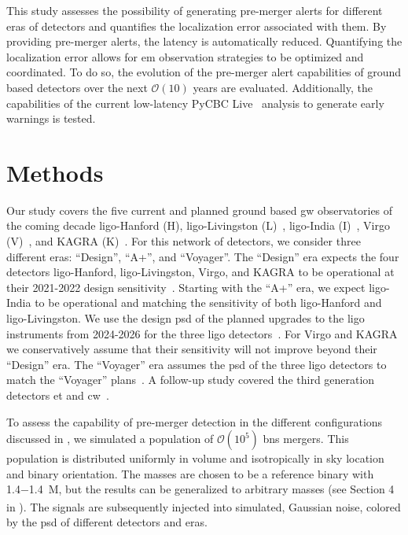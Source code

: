 This study assesses the possibility of generating pre-merger alerts for different eras of detectors and quantifies the localization error associated with them. By providing pre-merger alerts, the latency is automatically reduced. Quantifying the localization error allows for \acrshort{em} observation strategies to be optimized and coordinated. To do so, the evolution of the pre-merger alert capabilities of ground based detectors over the next $\mathcal{O}(10)$ years are evaluated. Additionally, the capabilities of the current low-latency PyCBC Live~\cite{Nitz:2018rgo, DalCanton:2020vpm} analysis to generate early warnings is tested.

\section{Methods}
Our study covers the five current and planned ground based \acrshort{gw} observatories of the coming decade \acrshort{ligo}-Hanford (H), \acrshort{ligo}-Livingston (L)~\cite{LIGOScientific:2014pky}, \acrshort{ligo}-India (I)~\cite{Iyer:2011aaa}, Virgo (V)~\cite{VIRGO:2014yos}, and KAGRA (K)~\cite{KAGRA:2018plz}. For this network of detectors, we consider three different eras: ``Design'', ``A+'', and ``Voyager''. The ``Design'' era expects the four detectors \acrshort{ligo}-Hanford, \acrshort{ligo}-Livingston, Virgo, and KAGRA to be operational at their 2021-2022 design sensitivity~\cite{KAGRA:2013rdx}. Starting with the ``A+'' era, we expect \acrshort{ligo}-India to be operational and matching the sensitivity of both \acrshort{ligo}-Hanford and \acrshort{ligo}-Livingston. We use the design \acrshort{psd} of the planned upgrades to the \acrshort{ligo} instruments from 2024-2026 for the three \acrshort{ligo} detectors~\cite{Barsotti:2018aaa}. For Virgo and KAGRA we conservatively assume that their sensitivity will not improve beyond their ``Design'' era. The ``Voyager'' era assumes the \acrshort{psd} of the three \acrshort{ligo} detectors to match the ``Voyager'' plans~\cite{LIGOScientific:2017aaa}. A follow-up study covered the third generation detectors \acrshort{et} and \acrshort{cw}~\cite{Nitz:2021pbr}.

To assess the capability of pre-merger detection in the different configurations discussed in \cite{Nitz:2020vym}, we simulated a population of $\mathcal{O}(10^5)$ \acrshort{bns} mergers. This population is distributed uniformly in volume and isotropically in sky location and binary orientation. The masses are chosen to be a reference binary with \SI[parse-numbers=false]{1.4-1.4}{M_\odot}, but the results can be generalized to arbitrary masses (see Section 4 in \cite{Nitz:2020vym}). The signals are subsequently injected into simulated, Gaussian noise, colored by the \acrshort{psd} of different detectors and eras.

